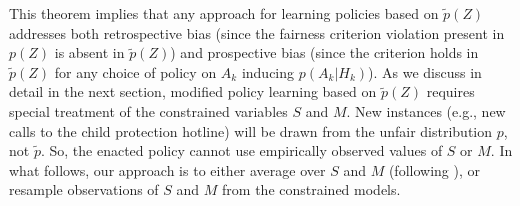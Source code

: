 \documentclass{article}
\begin{document}
This theorem implies that any approach for learning policies based on $\tilde{p}(Z)$ addresses both retrospective bias (since the fairness criterion violation present in $p(Z)$ is absent in $\tilde{p}(Z)$) and prospective bias (since the criterion holds in $\tilde{p}(Z)$ for any choice of policy on $A_k$ inducing $p(A_k | H_k)$).
As we discuss in detail in the next section, modified policy learning based on $\tilde{p}(Z)$
requires special treatment of the constrained variables $S$ and $M$. New instances (e.g., new calls to the child protection hotline) will be drawn from the unfair distribution $p$, not $\tilde{p}$. So, the enacted policy cannot use empirically observed values of $S$ or $M$. In what follows, our approach is to either average over $S$ and $M$ (following \citet{NabiShpitser18Fair}), or resample observations of $S$ and $M$ from the constrained models.

\end{document}
